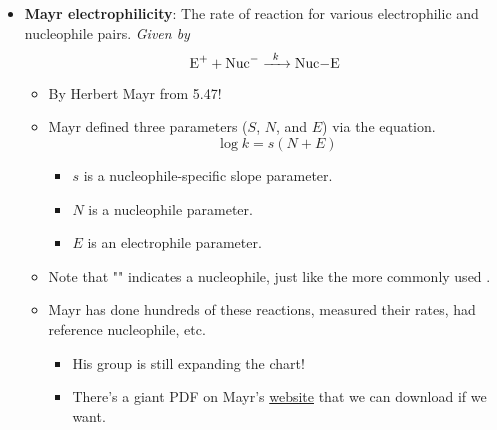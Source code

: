 \documentclass[../notes.tex]{subfiles}
\begin{document}
\begin{itemize}
\begin{table}[h!]
\begin{tabular}{l|ccc}
        \end{tabular}
        \caption{HIAs and the rate of solvolysis are not correlated.}
        \label{tab:HIAk}
    \end{table}
    \begin{itemize}
        \item To be clear, we are listing the HIA of the benzyl, allyl, and isopropyl cations.
        \item Benzyl bromide affords a cation that is both the most stable and the most reactive in the set.\footnote{Clarify??}
        \item Note that in general, solution-phase measures of stability like solvolysis and gas-phase measures of stability like the HIA \emph{don't} correlate. This means that we do have to measure them independently.
    \end{itemize}
    \item \textbf{Mayr electrophilicity}: The rate of reaction for various electrophilic and nucleophile pairs. \emph{Given by}
    \begin{equation*}
        \ce{E+ + Nuc- ->[$k$] Nuc-E}
    \end{equation*}
    \begin{itemize}
        \item By Herbert Mayr from 5.47!
        \item Mayr defined three parameters ($S$, $N$, and $E$) via the equation.
        \begin{equation*}
            \log k = s(N+E)
        \end{equation*}
        \begin{itemize}
            \item $s$ is a nucleophile-specific slope parameter.
            \item $N$ is a nucleophile parameter.
            \item $E$ is an electrophile parameter.
        \end{itemize}
        \item Note that "" indicates a nucleophile, just like the more commonly used .
        \item Mayr has done hundreds of these reactions, measured their rates, had reference nucleophile, etc.
        \begin{itemize}
            \item His group is still expanding the chart!
            \item There's a giant PDF on Mayr's \href{https://www.cup.uni-muenchen.de/oc/mayr/DBintro.html}{website} that we can download if we want.

\end{itemize}
\end{itemize}
\end{itemize}
\end{document}
